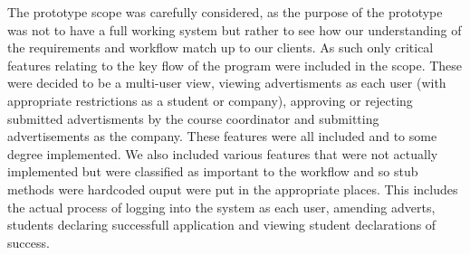 The prototype scope was carefully considered, as the purpose of the prototype was not
to have a full working system but rather to see how our understanding of the requirements
and workflow match up to our clients. As such only critical features relating to the key
flow of the program were included in the scope. These were decided to be a multi-user view,
viewing advertisments as each user (with appropriate restrictions as a student 
or company), approving or rejecting submitted advertisments by the course coordinator and 
submitting advertisements as the company. These features were all included and to some degree
implemented. We also included various features that were not actually implemented but were
classified as important to the workflow and so stub methods were hardcoded ouput were put in 
the appropriate places. This includes the actual process of logging into the system as each user,
amending adverts, students declaring successfull application and viewing student declarations 
of success.

